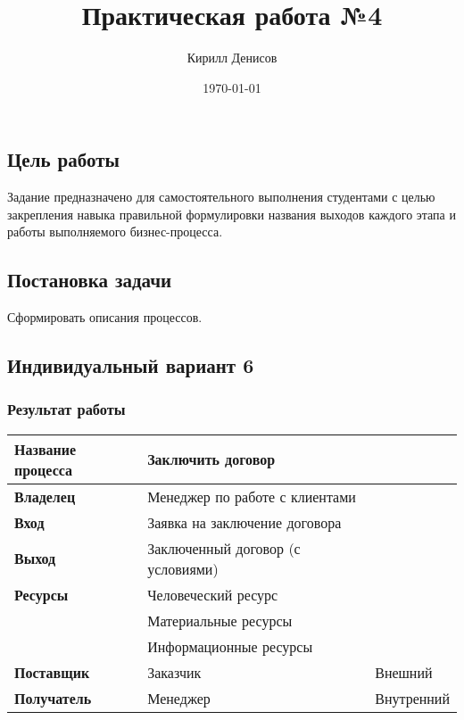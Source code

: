 \documentclass[a4paper,14pt]{extarticle}
\author{Кирилл Денисов}
\title{Практическая работа №4}
\date{\today}
\newcommand{\pathToCommonFolder}{/home/denilai/Documents/repos/latex/Common}
\begin{document}
	\thispagestyle{empty}
	
	\newpage
	\newpage
{}

\subsection*{Цель работы}
Задание предназначено для самостоятельного выполнения студентами с
целью закрепления навыка правильной формулировки названия выходов каждого
этапа и работы выполняемого бизнес-процесса.

\subsection*{Постановка задачи}
Сформировать описания процессов.

\subsection*{Индивидуальный вариант 6}

\subsubsection*{Результат работы}

\begin{table}[htbp]
	\begin{center}
		\begin{tabular}{|l|l|l|}
			\hline
			\textbf{Название процесса} & Заключить договор &  \\ \hline
			\textbf{Владелец} & Менеджер по работе с клиентами &  \\ \hline
			\textbf{Вход} & Заявка на заключение договора &  \\ \hline
			\textbf{Выход} & Заключенный договор (с  условиями) &  \\ \hline
			\multicolumn{ 1}{|l|}{\textbf{Ресурсы}} & Человеческий ресурс &  \\ \cline{ 2- 3}
			\multicolumn{ 1}{|l|}{} & Материальные ресурсы &  \\ \cline{ 2- 3}
			\multicolumn{ 1}{|l|}{} & Информационные ресурсы &  \\ \hline
			\textbf{Поставщик} & Заказчик & Внешний \\ \hline
			\textbf{Получатель} & Менеджер & Внутренний \\ \hline
		\end{tabular}
	\end{center}
	\label{}
\end{table}
\end{document}
